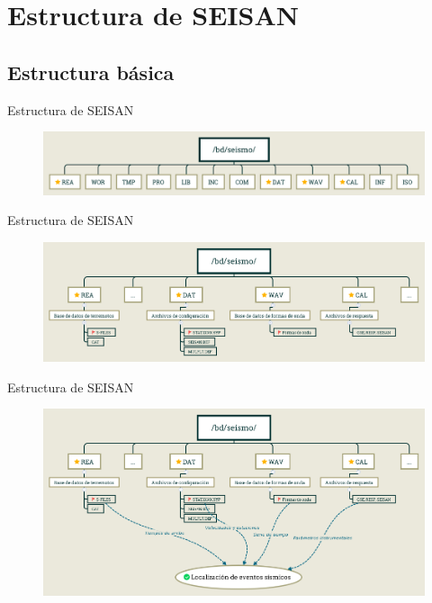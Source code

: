\documentclass[11pt]{beamer}
\begin{document}
\section{Estructura de SEISAN}
\subsection{Estructura básica}
\begin{frame}{Estructura de SEISAN}
\begin{figure}
\includegraphics[scale=0.28]{estructura_seisan_1.png}
\end{figure}
\end{frame}

\begin{frame}{Estructura de SEISAN}
\begin{figure}
\includegraphics[scale=0.28]{estructura_seisan2.png}
\end{figure}
\end{frame}

\begin{frame}{Estructura de SEISAN}
\begin{figure}
\includegraphics[scale=0.28]{estructura_seisan3.png}
\end{figure}
\end{frame}
\end{document}
